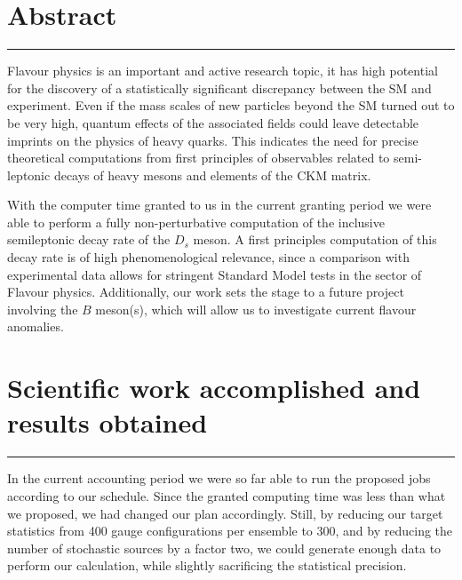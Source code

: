 \documentclass [a4paper, 11pt]{article}
\begin{document}
\newpage

\vfill
\tableofcontents
\vfill

\newpage

\section{Abstract}\label{sec:abstract}
\rule{\textwidth}{0.4pt}


Flavour physics is an important and active research topic, it has high potential
for the discovery of a statistically significant discrepancy between the SM and
experiment.
Even if the mass scales of new
particles beyond the SM turned out to be very high, quantum effects of
the associated fields could leave detectable imprints on the physics
of heavy quarks.
This indicates the need for precise theoretical computations from
first principles of observables related to semi-leptonic decays of
heavy mesons and elements of the CKM matrix. 

With the computer time granted to us in the current granting period we
were able to perform a fully non-perturbative computation of the inclusive semileptonic
decay rate of the $D_s$ meson.
A first principles computation of this decay rate is of high
phenomenological relevance, since a comparison with experimental data
allows for stringent Standard Model tests in the sector of Flavour physics.
Additionally, our work sets the stage to a future
project involving the $B$ meson(s), which will allow us to
investigate current flavour anomalies.



\section{Scientific work accomplished and results obtained}\label{sec:results}
\rule{\textwidth}{0.4pt}

In the current accounting period we were so far able to run the
proposed jobs according to our schedule. Since the granted computing
time was less than what we proposed, we had changed our plan
accordingly.
Still, by reducing our target statistics from 400 gauge
configurations per ensemble to 300, and by reducing the
number of stochastic sources by a factor two,
we could
generate enough data to perform our calculation, while slightly
sacrificing the statistical precision. 
\end{document}
